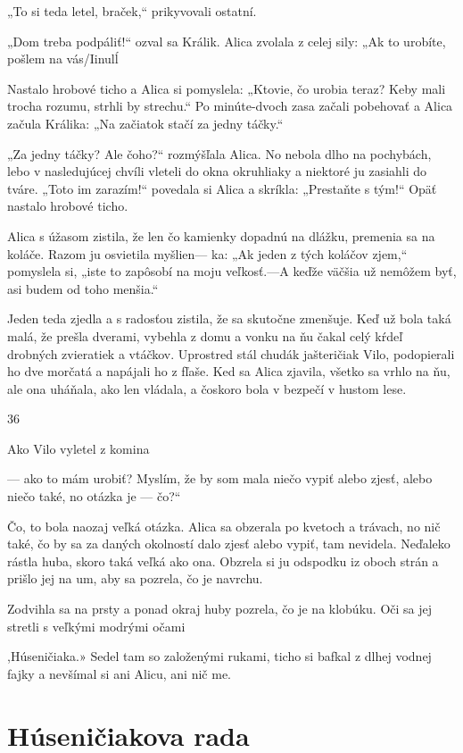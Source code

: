 \documentclass[12pt]{book}
\begin{document}
\begin{Parallel}[p]{}{}
{„To si teda letel, braček,“ prikyvovali ostatní.

„Dom treba podpáliť!“ ozval sa Králik. Alica zvolala
z celej sily: „Ak to urobíte, pošlem na vás/Iinulĺ

Nastalo hrobové ticho a Alica si pomyslela: „Ktovie, čo
urobia teraz? Keby mali trocha rozumu, strhli by strechu.“
Po minúte-dvoch zasa začali pobehovať a Alica začula
Králika: „Na začiatok stačí za jedny táčky.“

„Za jedny táčky? Ale čoho?“ rozmýšľala Alica. No
nebola dlho na pochybách, lebo v nasledujúcej chvíli vleteli
do okna okruhliaky a niektoré ju zasiahli do tváre. „Toto im
zarazím!“ povedala si Alica a skríkla: „Prestaňte s tým!“
Opäť nastalo hrobové ticho.

Alica s úžasom zistila, že len čo kamienky dopadnú na
dlážku, premenia sa na koláče. Razom ju osvietila myšlien—
ka: „Ak jeden z tých koláčov zjem,“ pomyslela si, „iste to
zapôsobí na moju veľkosť.—A keďže väčšia už nemôžem byť,
asi budem od toho menšia.“

Jeden teda zjedla a s radosťou zistila, že sa skutočne
zmenšuje. Keď už bola taká malá, že prešla dverami,
vybehla z domu a vonku na ňu čakal celý kŕdeľ drobných
zvieratiek a vtáčkov. Uprostred stál chudák jašteričiak
Vilo, podopierali ho dve morčatá a napájali ho z fľaše.
Ked sa Alica zjavila, všetko sa vrhlo na ňu, ale ona uháňala,
ako len vládala, a čoskoro bola v bezpečí v hustom lese.

36

Ako Vilo vyletel z komina

— ako to mám urobiť? Myslím, že by som mala niečo vypiť
alebo zjesť, alebo niečo také, no otázka je — čo?“

Čo, to bola naozaj veľká otázka. Alica sa obzerala po
kvetoch a trávach, no nič také, čo by sa za daných okolností
dalo zjesť alebo vypiť, tam nevidela. Neďaleko rástla huba,
skoro taká veľká ako ona. Obzrela si ju odspodku iz oboch
strán a prišlo jej na um, aby sa pozrela, čo je navrchu.

Zodvihla sa na prsty a ponad okraj huby pozrela, čo je na
klobúku. Oči sa jej stretli s veľkými modrými očami

,Húseničiaka.» Sedel tam so založenými rukami, ticho si
bafkal z dlhej vodnej fajky a nevšímal si ani Alicu, ani nič
me.

\section{Húseničiakova rada}

}
\end{Parallel}
\end{document}
